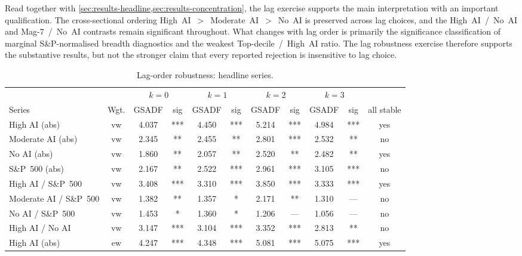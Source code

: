 Read together with \cref{sec:results-headline,sec:results-concentration}, the lag exercise supports the main interpretation with an important qualification. The cross-sectional ordering High~AI~$>$~Moderate~AI~$>$~No~AI is preserved across lag choices, and the High~AI~/~No~AI and Mag-7~/~No~AI contrasts remain significant throughout. What changes with lag order is primarily the significance classification of marginal S\&P-normalised breadth diagnostics and the weakest Top-decile~/~High~AI ratio. The lag robustness exercise therefore supports the substantive results, but not the stronger claim that every reported rejection is insensitive to lag choice.

\begin{table}[t]
\centering
\caption{Lag-order robustness: headline series.}
\label{tab:rob-lags-headline}
\small
\begin{tabular}{l c S[table-format=1.3] c S[table-format=1.3] c S[table-format=1.3] c S[table-format=1.3] c c}
\toprule
 & &  &  &  &  & \\
\cmidrule(lr){3-4}\cmidrule(lr){5-6}\cmidrule(lr){7-8}\cmidrule(lr){9-10}
Series & Wgt. & {GSADF} & sig & {GSADF} & sig & {GSADF} & sig & {GSADF} & sig & all stable \\
\midrule
High AI (abs)              & vw & 4.037 & *** & 4.450 & *** & 5.214 & *** & 4.984 & *** & yes \\
Moderate AI (abs)          & vw & 2.345 & **  & 2.455 & **  & 2.801 & *** & 2.532 & **  & no  \\
No AI (abs)                & vw & 1.860 & **  & 2.057 & **  & 2.520 & **  & 2.482 & **  & yes \\
S\&P~500 (abs)             & vw & 2.167 & **  & 2.522 & *** & 2.961 & *** & 3.105 & *** & no  \\
High AI / S\&P~500         & vw & 3.408 & *** & 3.310 & *** & 3.850 & *** & 3.333 & *** & yes \\
Moderate AI / S\&P~500     & vw & 1.382 & **  & 1.357 & *   & 2.171 & **  & 1.310 & ---  & no  \\
No AI / S\&P~500           & vw & 1.453 & *   & 1.360 & *   & 1.206 & --- & 1.056 & --- & no  \\
High AI / No AI            & vw & 3.147 & *** & 3.104 & *** & 3.352 & *** & 2.813 & **  & no  \\
\midrule
High AI (abs)              & ew & 4.247 & *** & 4.348 & *** & 5.081 & *** & 5.075 & *** & yes \\

\end{tabular}
\end{table}
